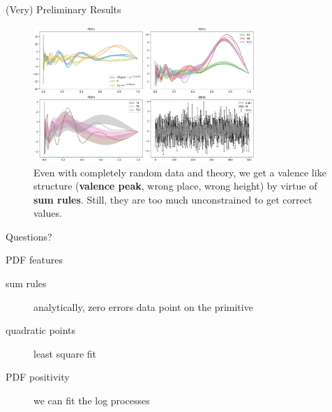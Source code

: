 \documentclass[9pt]{beamer}
\begin{document}
\begin{frame}{(Very) Preliminary Results}
    \vspace*{10pt}
    \begin{figure}
        \centering
        \includegraphics[width=0.75\textwidth]{fit-pdf}
        \caption{
            Even with completely random data and theory, we get a valence like
            structure (\textbf{valence peak}, wrong place, wrong height) by
            virtue of \textbf{sum rules}. Still, they are too much
            unconstrained to get correct values.
        }
    \end{figure}
\end{frame}

\begin{frame}[standout]
    Questions?
\end{frame}

\appendix

\begin{frame}{PDF features}
    \begin{description}
        \item[sum rules] analytically, zero errors data point on the primitive
        \item[quadratic points] least square fit
        \item[PDF positivity] we can fit the log processes
    \end{description}
\end{frame}
\end{document}
